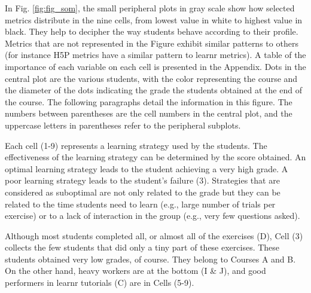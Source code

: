 \documentclass{aims}
\theoremstyle{definition}
\begin{document}
In Fig. \ref {fig:fig_som}, the small peripheral plots in gray scale
show how selected metrics distribute in the nine cells, from lowest
value in white to highest value in black. They help to decipher the way
students behave according to their profile. Metrics that are not
represented in the Figure exhibit similar patterns to others (for
instance H5P metrics have a similar pattern to learnr metrics). A table
of the importance of each variable on each cell is presented in the
Appendix. Dots in the central plot are the various students, with the
color representing the course and the diameter of the dots indicating
the grade the students obtained at the end of the course. The following
paragraphs detail the information in this figure. The numbers between
parentheses are the cell numbers in the central plot, and the uppercase
letters in parentheses refer to the peripheral subplots.

Each cell (1-9) represents a learning strategy used by the students. The
effectiveness of the learning strategy can be determined by the score
obtained. An optimal learning strategy leads to the student achieving a
very high grade. A poor learning strategy leads to the student's failure
(3). Strategies that are considered as suboptimal are not only related
to the grade but they can be related to the time students need to learn
(e.g., large number of trials per exercise) or to a lack of interaction
in the group (e.g., very few questions asked).

Although most students completed all, or almost all of the exercises
(D), Cell (3) collects the few students that did only a tiny part of
these exercises. These students obtained very low grades, of course.
They belong to Courses A and B. On the other hand, heavy workers are at
the bottom (I \& J), and good performers in learnr tutorials (C) are in
Cells (5-9).
\end{document}
